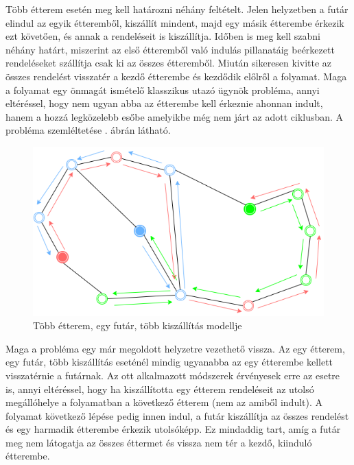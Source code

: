 

Több étterem esetén meg kell határozni néhány feltételt. Jelen helyzetben a futár elindul az egyik étteremből, kiszállít mindent, majd egy másik étterembe érkezik ezt követően, és annak a rendeléseit is kiszállítja. Időben is meg kell szabni néhány határt, miszerint az első étteremből való indulás pillanatáig beérkezett rendeléseket szállítja csak ki az összes étteremből. Miután sikeresen kivitte az összes rendelést visszatér a kezdő étterembe és kezdődik előlről a folyamat. Maga a folyamat egy önmagát ismételő klasszikus utazó ügynök probléma, annyi eltéréssel, hogy nem ugyan abba az étterembe kell érkeznie ahonnan indult, hanem a hozzá legközelebb esőbe amelyikbe még nem járt az adott ciklusban. A probléma szemléltetése . ábrán látható.\cite{Diagrams.net}

\begin{figure}[h!]
\centering
\includegraphics[scale=0.6]{images/Circulartsp.png}
\caption{Több étterem, egy futár, több kiszállítás modellje}
\label{fig:model3}
\end{figure}



Maga a probléma egy már megoldott helyzetre vezethető vissza. Az egy étterem, egy futár, több kiszállítás eseténél mindig ugyanabba az egy étterembe kellett visszatérnie a futárnak. Az ott alkalmazott módszerek érvényesek erre az esetre is, annyi eltéréssel, hogy ha kiszállította egy étterem rendeléseit az utolsó megállóhelye a folyamatban a következő étterem (nem az amiből indult). A folyamat következő lépése pedig innen indul, a futár kiszállítja az összes rendelést és egy harmadik étterembe érkezik utolsóképp. Ez mindaddig tart, amíg a futár meg nem látogatja az összes éttermet és vissza nem tér a kezdő, kiinduló étterembe. 

